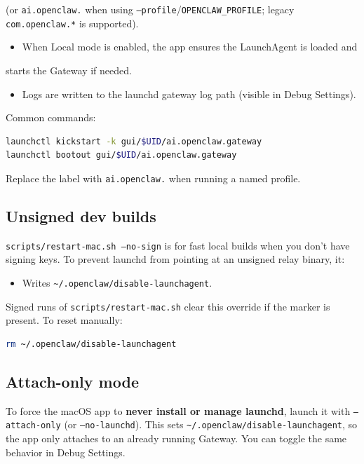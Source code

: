(or \texttt{ai.openclaw.} when using \texttt{--profile}/\texttt{OPENCLAW\_PROFILE}; legacy \texttt{com.openclaw.*} is supported).
\begin{itemize}
  \item When Local mode is enabled, the app ensures the LaunchAgent is loaded and
\end{itemize}

starts the Gateway if needed.
\begin{itemize}
  \item Logs are written to the launchd gateway log path (visible in Debug Settings).
\end{itemize}


Common commands:

\begin{lstlisting}[language=bash]
launchctl kickstart -k gui/$UID/ai.openclaw.gateway
launchctl bootout gui/$UID/ai.openclaw.gateway
\end{lstlisting}


Replace the label with \texttt{ai.openclaw.} when running a named profile.

\subsection{Unsigned dev builds}


\texttt{scripts/restart-mac.sh --no-sign} is for fast local builds when you don’t have
signing keys. To prevent launchd from pointing at an unsigned relay binary, it:

\begin{itemize}
  \item Writes \texttt{\textasciitilde{}/.openclaw/disable-launchagent}.
\end{itemize}


Signed runs of \texttt{scripts/restart-mac.sh} clear this override if the marker is
present. To reset manually:

\begin{lstlisting}[language=bash]
rm ~/.openclaw/disable-launchagent
\end{lstlisting}


\subsection{Attach-only mode}


To force the macOS app to \textbf{never install or manage launchd}, launch it with
\texttt{--attach-only} (or \texttt{--no-launchd}). This sets \texttt{\textasciitilde{}/.openclaw/disable-launchagent},
so the app only attaches to an already running Gateway. You can toggle the same
behavior in Debug Settings.

